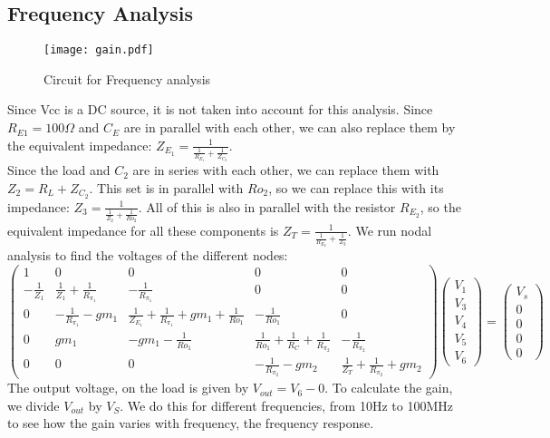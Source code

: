 \subsection{Frequency Analysis}
\begin{figure}[H] \centering
\texttt{[image: gain.pdf]}
\caption{Circuit for Frequency analysis}
\label{fig:oc2}
\end{figure} 
Since Vcc is a DC source, it is not taken into account for this analysis.
Since $R_{E1}=100 \Omega$ and $C_E$ are in parallel with each other, we can also replace them by the equivalent impedance: $Z_{E_1}=\frac{1}{\frac{1}{R_{E_1}}+\frac{1}{Z_{C_2}}}$.\\
Since the load and $C_2$ are in series with each other, we can replace them with $Z_2=R_L+Z_{C_2}$. This set is in parallel with $Ro_2$, so we can replace this with its impedance: $Z_3=\frac{1}{\frac{1}{Z_2}+\frac{1}{Ro_2}}$. All of this is also in parallel with the resistor $R_{E_2}$, so the equivalent impedance for all these components is $Z_T=\frac{1}{\frac{1}{R_{E_2}}+\frac{1}{Z_3}}$.
We run nodal analysis to find the voltages of the different nodes:
\begin{equation}
\left(\begin{array}{ccccc} 1 & 0 & 0 & 0 & 0\\ -\frac{1}{Z_1} & \frac{1}{Z_1}+\frac{1}{R_{\pi_1}} & -\frac{1}{R_{\pi_1}} & 0 & 0\\
0 & -\frac{1}{R_{\pi_1}}-gm_1 & \frac{1}{Z_{E_1}}+\frac{1}{R_{\pi_1}}+gm_1+\frac{1}{Ro_1} & -\frac{1}{Ro_1} & 0\\0&  gm_1 & -gm_1-\frac{1}{Ro_1} & \frac{1}{Ro_1}+\frac{1}{R_C}+\frac{1}{R_{\pi_2}} & -\frac{1}{R_{\pi_2}} \\
0 & 0 & 0 & -\frac{1}{R_{\pi_2}} -gm_2 &\frac{1}{Z_T}+\frac{1}{R_{\pi_2}}+gm_2
\end{array}\right)
\left(\begin{array}{c} V_1 \\ V_3 \\ V_4 \\ V_5 \\V_6 \end{array}\right) 
= \left(\begin{array}{c} V_s \\ 0 \\ 0 \\0 \\ 0\end{array}\right)
\end{equation}
The output voltage, on the load is given by $V_{out}=V_6-0$. To calculate the gain, we divide $V_{out}$ by $V_{S}$. We do this for different frequencies, from 10Hz to 100MHz to see how the gain varies with frequency, the frequency response.
